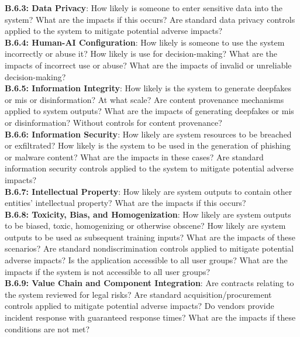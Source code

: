 \documentclass[fleqn]{article}
\begin{document}
\noindent\textbf{B.6.3: Data Privacy}: How likely is someone to enter sensitive data into the system? What are the impacts if this occurs? Are standard data privacy controls applied to the system to mitigate potential adverse impacts?\\

\noindent\textbf{B.6.4: Human-AI Configuration}: How likely is someone to use the system incorrectly or abuse it? How likely is use for decision-making? What are the impacts of incorrect use or abuse? What are the impacts of invalid or unreliable decision-making?\\

\noindent\textbf{B.6.5: Information Integrity}: How likely is the system to generate deepfakes or mis or disinformation? At what scale? Are content provenance mechanisms applied to system outputs? What are the impacts of generating deepfakes or mis or disinformation? Without controls for content provenance?\\

\noindent\textbf{B.6.6: Information Security}: How likely are system resources to be breached or exfiltrated? How likely is the system to be used in the generation of phishing or malware content? What are the impacts in these cases? Are standard information security controls applied to the system to mitigate potential adverse impacts? \\

\noindent\textbf{B.6.7: Intellectual Property}: How likely are system outputs to contain other entities' intellectual property? What are the impacts if this occurs?\\

\noindent\textbf{B.6.8: Toxicity, Bias, and Homogenization}: How likely are system outputs to be biased, toxic, homogenizing or otherwise obscene? How likely are system outputs to be used as subsequent training inputs? What are the impacts of these scenarios? Are standard nondiscrimination controls applied to mitigate potential adverse impacts? Is the application accessible to all user groups? What are the impacts if the system is not accessible to all user groups?\\

\noindent\textbf{B.6.9: Value Chain and Component Integration}: Are contracts relating to the system reviewed for legal risks? Are standard acquisition/procurement controls applied to mitigate potential adverse impacts? Do vendors provide incident response with guaranteed response times? What are the impacts if these conditions are not met?
\end{document}
